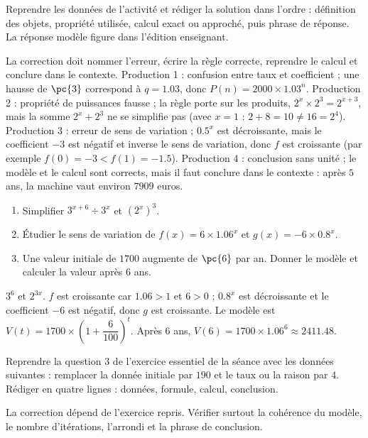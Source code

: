 \begin{example}
Reprendre les données de l'activité et rédiger la solution dans l'ordre : définition des objets, propriété utilisée, calcul exact ou approché, puis phrase de réponse. La réponse modèle figure dans l'édition enseignant.
\end{example}
\begin{solution}La correction doit nommer l'erreur, écrire la règle correcte, reprendre le calcul et conclure dans le contexte. Production 1 : confusion entre taux et coefficient ; une hausse de $\pc{3}$ correspond à $q=\num{1,03}$, donc $P(n)=\num{2000}\times\num{1,03}^n$. Production 2 : propriété de puissances fausse ; la règle porte sur les produits, $2^x\times2^3=2^{x+3}$, mais la somme $2^x+2^3$ ne se simplifie pas (avec $x=1$ : $2+8=10\neq16=2^4$). Production 3 : erreur de sens de variation ; $\num{0,5}^x$ est décroissante, mais le coefficient $-3$ est négatif et inverse le sens de variation, donc $f$ est croissante (par exemple $f(0)=-3<f(1)=-\num{1,5}$). Production 4 : conclusion sans unité ; le modèle et le calcul sont corrects, mais il faut conclure dans le contexte : après $5$ ans, la machine vaut environ $\num{7909}$ euros.\end{solution}

\begin{exercise}[essentiel]
\begin{enumerate}\item Simplifier $3^{x+6}\div3^x$ et $(2^x)^3$.\item Étudier le sens de variation de $f(x)=6\times\num{1,06}^x$ et $g(x)=-6\times\num{0,8}^x$.\item Une valeur initiale de $1700$ augmente de $\pc{6}$ par an. Donner le modèle et calculer la valeur après $6$ ans.\end{enumerate}
\end{exercise}
\begin{solution}$3^6$ et $2^{3x}$. $f$ est croissante car $\num{1,06}>1$ et $6>0$ ; $\num{0,8}^x$ est décroissante et le coefficient $-6$ est négatif, donc $g$ est croissante. Le modèle est $V(t)=1700\times\left(1+\dfrac{6}{100}\right)^t$. Après $6$ ans, $V(6)=1700\times\num{1,06}^6\approx\num{2411,48}$.\end{solution}


\begin{homework}Reprendre la question 3 de l'exercice essentiel de la séance avec les données suivantes : remplacer la donnée initiale par $190$ et le taux ou la raison par $4$. Rédiger en quatre lignes : données, formule, calcul, conclusion.\end{homework}
\begin{solution}La correction dépend de l'exercice repris. Vérifier surtout la cohérence du modèle, le nombre d'itérations, l'arrondi et la phrase de conclusion.\end{solution}

